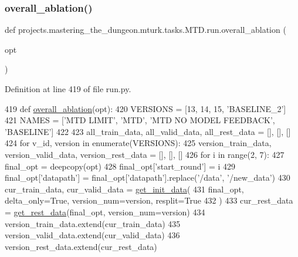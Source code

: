 \subsubsection{\texorpdfstring{overall\+\_\+ablation()}{overall\_ablation()}}
{\footnotesize\ttfamily def projects.\+mastering\+\_\+the\+\_\+dungeon.\+mturk.\+tasks.\+M\+T\+D.\+run.\+overall\+\_\+ablation (\begin{DoxyParamCaption}\item[{}]{opt }\end{DoxyParamCaption})}



Definition at line 419 of file run.\+py.


\begin{DoxyCode}
419 \textcolor{keyword}{def }\hyperlink{namespaceprojects_1_1mastering__the__dungeon_1_1mturk_1_1tasks_1_1MTD_1_1run_a09ef624249e781a7cb8a9b65993aa370}{overall\_ablation}(opt):
420     VERSIONS = [13, 14, 15, \textcolor{stringliteral}{'BASELINE\_2'}]
421     NAMES = [\textcolor{stringliteral}{'MTD LIMIT'}, \textcolor{stringliteral}{'MTD'}, \textcolor{stringliteral}{'MTD NO MODEL FEEDBACK'}, \textcolor{stringliteral}{'BASELINE'}]
422 
423     all\_train\_data, all\_valid\_data, all\_rest\_data = [], [], []
424     \textcolor{keywordflow}{for} v\_id, version \textcolor{keywordflow}{in} enumerate(VERSIONS):
425         version\_train\_data, version\_valid\_data, version\_rest\_data = [], [], []
426         \textcolor{keywordflow}{for} i \textcolor{keywordflow}{in} range(2, 7):
427             final\_opt = deepcopy(opt)
428             final\_opt[\textcolor{stringliteral}{'start\_round'}] = i
429             final\_opt[\textcolor{stringliteral}{'datapath'}] = final\_opt[\textcolor{stringliteral}{'datapath'}].replace(\textcolor{stringliteral}{'/data'}, \textcolor{stringliteral}{'/new\_data'})
430             cur\_train\_data, cur\_valid\_data = \hyperlink{namespaceprojects_1_1mastering__the__dungeon_1_1mturk_1_1tasks_1_1MTD_1_1run_ae84843b54586b020d47c60d95340e1d7}{get\_init\_data}(
431                 final\_opt, delta\_only=\textcolor{keyword}{True}, version\_num=version, resplit=\textcolor{keyword}{True}
432             )
433             cur\_rest\_data = \hyperlink{namespaceprojects_1_1mastering__the__dungeon_1_1mturk_1_1tasks_1_1MTD_1_1run_ae9acbe1fe240a624b01fed3f073cc780}{get\_rest\_data}(final\_opt, version\_num=version)
434             version\_train\_data.extend(cur\_train\_data)
435             version\_valid\_data.extend(cur\_valid\_data)
436             version\_rest\_data.extend(cur\_rest\_data)

\end{DoxyCode}
